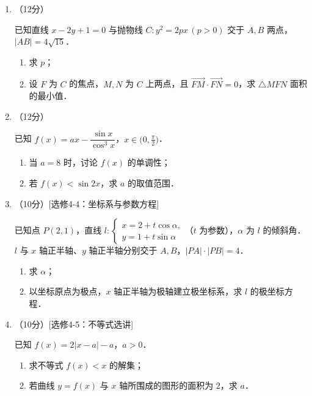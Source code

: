 \begin{description}
\begin{enumerate}[leftmargin=5pt]
        \item （12分）

        已知直线 $x-2y+1=0$ 与抛物线 $C:y^2=2px\,(p>0)$ 交于 $A,B$ 两点，$|AB|=4\sqrt{15}$．

        \begin{enumerate}[label=(\arabic*)]
            \item 求 $p$；
            \item 设 $F$ 为 $C$ 的焦点，$M,N$ 为 $C$ 上两点，且 $\overrightarrow{FM}\cdot\overrightarrow{FN}=0$，求 $\triangle MFN$ 面积的最小值．
        \end{enumerate}

        \item （12分）

        已知 $f(x)=ax-\dfrac{\sin x}{\cos^3 x}$，$x\in\bigl(0,\frac{\pi}{2}\bigr)$．

        \begin{enumerate}[label=(\arabic*)]
            \item 当 $a=8$ 时，讨论 $f(x)$ 的单调性；
            \item 若 $f(x)<\sin2x$，求 $a$ 的取值范围．
        \end{enumerate}

        \item （10分）[选修4-4：坐标系与参数方程]

        已知点 $P(2,1)$，直线 $l:\begin{cases}x=2+t\cos\alpha,\\y=1+t\sin\alpha\end{cases}$（$t$ 为参数），$\alpha$ 为 $l$ 的倾斜角．$l$ 与 $x$ 轴正半轴、$y$ 轴正半轴分别交于 $A,B$，$|PA|\cdot|PB|=4$．

        \begin{enumerate}[label=(\arabic*)]
            \item 求 $\alpha$；
            \item 以坐标原点为极点，$x$ 轴正半轴为极轴建立极坐标系，求 $l$ 的极坐标方程．
        \end{enumerate}

        \item （10分）[选修4-5：不等式选讲]

        已知 $f(x)=2|x-a|-a$，$a>0$．

        \begin{enumerate}[label=(\arabic*)]
            \item 求不等式 $f(x)<x$ 的解集；
            \item 若曲线 $y=f(x)$ 与 $x$ 轴所围成的图形的面积为 $2$，求 $a$．
        \end{enumerate}
    \end{enumerate}
\end{description}
\clearpage


